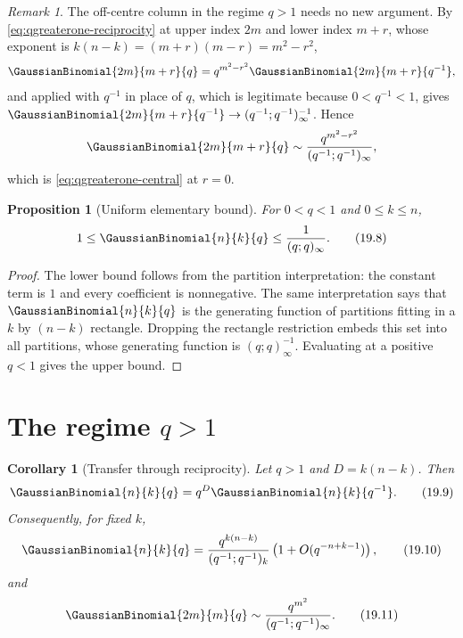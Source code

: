 \documentclass[11pt,a4paper,oneside,openany]{book}
\newtheorem{proposition}[proposition]{Proposition}
\newtheorem{corollary}[corollary]{Corollary}
\theoremstyle{definition}
\theoremstyle{remark}
\newtheorem{remark}[remark]{Remark}
\begin{document}
\begin{remark}\label{rem:offcentre-qgreaterone}
The off-centre column in the regime $q>1$ needs no new argument.  By
\eqref{eq:qgreaterone-reciprocity} at upper index $2m$ and lower index $m+r$,
whose exponent is $k(n-k)=(m+r)(m-r)=m^2-r^2$,
\[
 \GaussianBinomial{2m}{m+r}{q}=q^{m^2-r^2}\GaussianBinomial{2m}{m+r}{q^{-1}},
\]
and  applied with $q^{-1}$ in place of $q$, which is
legitimate because $0<q^{-1}<1$, gives
$\GaussianBinomial{2m}{m+r}{q^{-1}}\to(q^{-1};q^{-1})_\infty^{-1}$.  Hence
\[
 \GaussianBinomial{2m}{m+r}{q}
 \sim\frac{q^{m^2-r^2}}{(q^{-1};q^{-1})_\infty},
\]
which is \eqref{eq:qgreaterone-central} at $r=0$.
\end{remark}

\begin{proposition}[Uniform elementary bound]\label{prop:gaussian-bound}
For $0<q<1$ and $0\le k\le n$,
\[
 1\le\GaussianBinomial{n}{k}{q}\le\frac1{(q;q)_\infty}.
 \tag{19.8}\label{eq:gaussian-bound}
\]
\end{proposition}

\begin{proof}
The lower bound follows from the partition interpretation: the constant term is $1$ and every coefficient is nonnegative.  The same interpretation says that $\GaussianBinomial{n}{k}{q}$ is the generating function of partitions fitting in a $k$ by $(n-k)$ rectangle.  Dropping the rectangle restriction embeds this set into all partitions, whose generating function is $(q;q)_\infty^{-1}$.  Evaluating at a positive $q<1$ gives the upper bound.
\end{proof}

\section{The regime \texorpdfstring{$q>1$}{q greater than 1}}

\begin{corollary}[Transfer through reciprocity]\label{cor:qgreaterone}
Let $q>1$ and $D=k(n-k)$.  Then
\[
 \GaussianBinomial{n}{k}{q}=q^D\GaussianBinomial{n}{k}{q^{-1}}.
 \tag{19.9}\label{eq:qgreaterone-reciprocity}
\]
Consequently, for fixed $k$,
\[
 \GaussianBinomial{n}{k}{q}
 =\frac{q^{k(n-k)}}{(q^{-1};q^{-1})_k}
 \left(1+O(q^{-n+k-1})\right),
 \tag{19.10}\label{eq:qgreaterone-fixed-k}
\]
and
\[
 \GaussianBinomial{2m}{m}{q}
 \sim\frac{q^{m^2}}{(q^{-1};q^{-1})_\infty}.
 \tag{19.11}\label{eq:qgreaterone-central}
\]
\end{corollary}
\end{document}

